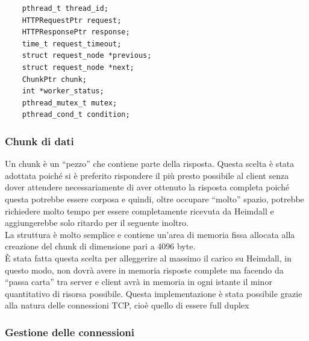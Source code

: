 \documentclass[italian]{tktltiki2}
\begin{document}
\begin{lstlisting}
    pthread_t thread_id;
    HTTPRequestPtr request;
    HTTPResponsePtr response;
    time_t request_timeout;
    struct request_node *previous;
    struct request_node *next;
    ChunkPtr chunk;
    int *worker_status;
    pthread_mutex_t mutex;
    pthread_cond_t condition;
\end{lstlisting}

\subsubsection*{Chunk di dati}
\label{sec:chunk}
Un chunk è un ``pezzo'' che contiene parte della risposta. Questa scelta è stata adottata poiché si è preferito rispondere il più presto possibile al client senza dover attendere necessariamente di aver ottenuto la risposta completa poiché questa potrebbe essere corposa e quindi, oltre occupare ``molto'' spazio, potrebbe richiedere molto tempo per essere completamente ricevuta da Heimdall e aggiungerebbe solo ritardo per il seguente inoltro.
\\
La struttura è molto semplice e contiene un'area di memoria fissa allocata alla creazione del chunk di dimensione pari a 4096 byte.
\\
È stata fatta questa scelta per alleggerire al massimo il carico su Heimdall, in questo modo, non dovrà avere in memoria risposte complete ma facendo da ``passa carta'' tra server e client avrà in memoria in ogni istante il minor quantitativo di risorsa possibile. Questa implementazione è stata possibile grazie alla natura delle connessioni TCP, cioè quello di essere full duplex

\subsubsection{Gestione delle connessioni}
\end{document}
